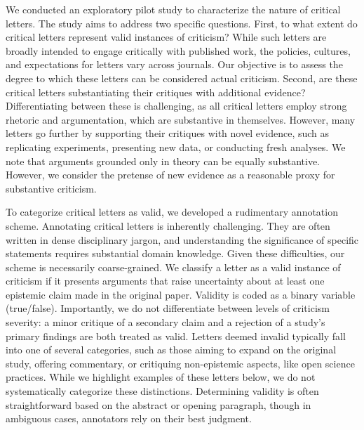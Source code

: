 \documentclass[12pt]{article} %
\begin{document}
We conducted an exploratory pilot study to characterize the nature of critical letters. 
The study aims to address two specific questions. 
First, to what extent do critical letters represent valid instances of criticism? 
While such letters are broadly intended to engage critically with published work, the policies, cultures, and expectations for letters vary across journals. Our objective is to assess the degree to which these letters can be considered actual criticism. 
Second, are these critical letters substantiating their critiques with additional evidence? 
Differentiating between these is challenging, as all critical letters employ strong rhetoric and argumentation, which are substantive in themselves. 
However, many letters go further by supporting their critiques with novel evidence, such as replicating experiments, presenting new data, or conducting fresh analyses. 
We note that arguments grounded only in theory can be equally substantive.
However, we consider the pretense of new evidence as a reasonable proxy for substantive criticism.

To categorize critical letters as valid, we developed a rudimentary annotation scheme. Annotating critical letters is inherently challenging. 
They are often written in dense disciplinary jargon, and understanding the significance of specific statements requires substantial domain knowledge. 
Given these difficulties, our scheme is necessarily coarse-grained. 
We classify a letter as a valid instance of criticism if it presents arguments that raise uncertainty about at least one epistemic claim made in the original paper. 
Validity is coded as a binary variable (true/false).
Importantly, we do not differentiate between levels of criticism severity: a minor critique of a secondary claim and a rejection of a study’s primary findings are both treated as valid. 
Letters deemed invalid typically fall into one of several categories, such as those aiming to expand on the original study, offering commentary, or critiquing non-epistemic aspects, like open science practices. 
While we highlight examples of these letters below, we do not systematically categorize these distinctions. 
Determining validity is often straightforward based on the abstract or opening paragraph, though in ambiguous cases, annotators rely on their best judgment.
\end{document}
